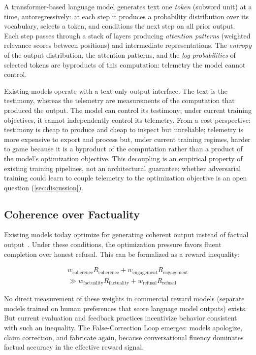 A transformer-based language model generates text one \emph{token} (subword
unit) at a time, autoregressively: at each step it produces a probability
distribution over its vocabulary, selects a token, and conditions the next step
on all prior output. Each step passes through a stack of layers producing
\emph{attention patterns} (weighted relevance scores between positions) and
intermediate representations. The \emph{entropy} of the output distribution,
the attention patterns, and the \emph{log-probabilities} of selected tokens are
byproducts of this computation: telemetry the model cannot control.

Existing models operate with a text-only output interface.
The text is the testimony, whereas the telemetry are measurements of the computation that produced the output. The model
can control its testimony; under current training objectives, it cannot
independently control its telemetry. From a cost perspective: testimony is
cheap to produce and cheap to inspect but unreliable; telemetry is more
expensive to export and process but, under current training regimes, harder to
game because it is a byproduct of the computation rather than a product of the
model's optimization objective. This decoupling is an empirical property of
existing training pipelines, not an architectural guarantee: whether
adversarial training could learn to couple telemetry to the optimization
objective is an open question (\autoref{sec:discussion}).

\subsection{Coherence over Factuality}

Existing models today optimize for generating coherent output instead of factual output~\cite{krestnikov2026truthcompressionartifactlanguage}.
Under these conditions, the optimization pressure favors fluent completion over
honest refusal. This can be formalized as a reward inequality:

\begin{multline*}
w_{\text{coherence}} R_{\text{coherence}} + w_{\text{engagement}} R_{\text{engagement}} \\
\gg w_{\text{factuality}} R_{\text{factuality}} + w_{\text{refusal}} R_{\text{refusal}}
\end{multline*}

No direct measurement of these weights in commercial reward models
(separate models trained on human preferences that score language model outputs)
exists. But
current evaluation and feedback practices incentivize behavior consistent with
such an inequality. The False-Correction Loop emerges: models apologize, claim
correction, and fabricate again, because conversational fluency dominates
factual accuracy in the effective reward signal.

